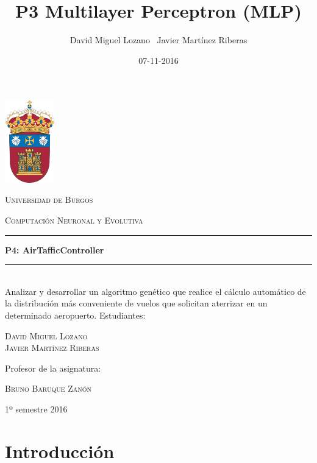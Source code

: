 \documentclass[a4paper,12pt,titlepage]{article}
\newcommand{\HRule}[1]{\rule{\linewidth}{#1}}
\begin{document}
\author{David Miguel Lozano \ Javier Martínez Riberas}
\title{P3 Multilayer Perceptron (MLP)}
\date{07-11-2016}

\begin{titlepage}
	\centering
	\includegraphics[width=0.16\textwidth]{ubu-logo.png}\par
	\vspace{0.3cm}
	{\scshape\LARGE Universidad de Burgos \par}
	\vfill
	{\scshape\Large Computación Neuronal y Evolutiva \par}
	\HRule{2pt}
	{\huge\bfseries P4: AirTafficController \par}
	\HRule{2pt}
	\\ [0.5cm]
	{Analizar y desarrollar un algoritmo genético que realice el cálculo automático de la distribución más conveniente de vuelos que solicitan aterrizar en un determinado aeropuerto.}
	\vfill
	Estudiantes:\par
	{\Large\scshape David Miguel Lozano \\ Javier Martínez Riberas \par}
	\vfill
	Profesor de la asignatura:\par
	\textsc{Bruno Baruque Zanón}
	\vfill
	{\large 1º semestre 2016 \par}
\end{titlepage}

\newpage
\tableofcontents
\begin{appendix}
\end{appendix}

\newpage

\section{Introducción}
\end{document}
